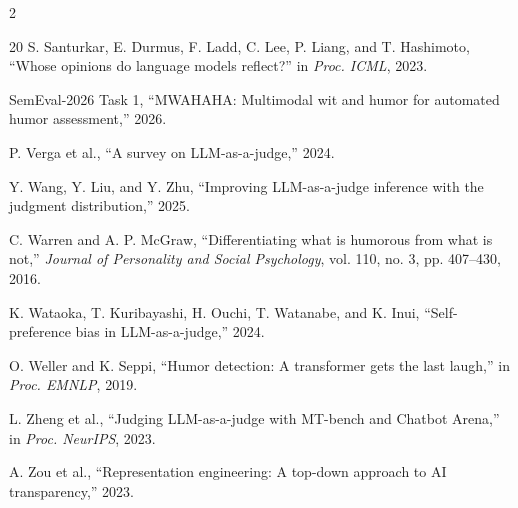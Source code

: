 \documentclass[10pt, a4paper]{article}
\begin{document}
\begin{multicols}{2}
\begin{thebibliography}{20}
S. Santurkar, E. Durmus, F. Ladd, C. Lee, P. Liang, and T. Hashimoto, ``Whose opinions do language models reflect?'' in \textit{Proc. ICML}, 2023.

SemEval-2026 Task 1, ``MWAHAHA: Multimodal wit and humor for automated humor assessment,'' 2026.

P. Verga et al., ``A survey on LLM-as-a-judge,'' 2024.

Y. Wang, Y. Liu, and Y. Zhu, ``Improving LLM-as-a-judge inference with the judgment distribution,'' 2025.

C. Warren and A. P. McGraw, ``Differentiating what is humorous from what is not,'' \textit{Journal of Personality and Social Psychology}, vol. 110, no. 3, pp. 407--430, 2016.

K. Wataoka, T. Kuribayashi, H. Ouchi, T. Watanabe, and K. Inui, ``Self-preference bias in LLM-as-a-judge,'' 2024.

O. Weller and K. Seppi, ``Humor detection: A transformer gets the last laugh,'' in \textit{Proc. EMNLP}, 2019.

L. Zheng et al., ``Judging LLM-as-a-judge with MT-bench and Chatbot Arena,'' in \textit{Proc. NeurIPS}, 2023.

A. Zou et al., ``Representation engineering: A top-down approach to AI transparency,'' 2023.

\end{thebibliography}
\end{multicols}
\end{document}
